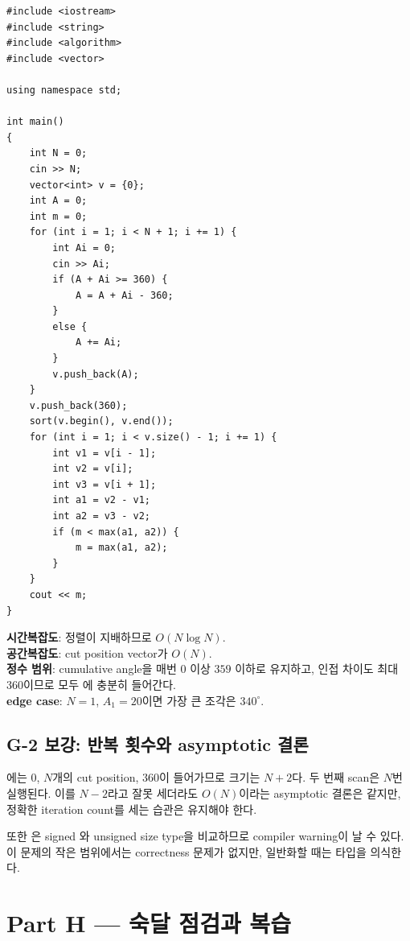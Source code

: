 \begin{answerbox}[학습자 제출 답안]
\begin{lstlisting}
#include <iostream>
#include <string>
#include <algorithm>
#include <vector>

using namespace std;

int main()
{
    int N = 0;
    cin >> N;
    vector<int> v = {0};
    int A = 0;
    int m = 0;
    for (int i = 1; i < N + 1; i += 1) {
        int Ai = 0;
        cin >> Ai;
        if (A + Ai >= 360) {
            A = A + Ai - 360;
        }
        else {
            A += Ai;
        }
        v.push_back(A);
    }
    v.push_back(360);
    sort(v.begin(), v.end());
    for (int i = 1; i < v.size() - 1; i += 1) {
        int v1 = v[i - 1];
        int v2 = v[i];
        int v3 = v[i + 1];
        int a1 = v2 - v1;
        int a2 = v3 - v2;
        if (m < max(a1, a2)) {
            m = max(a1, a2);
        }
    }
    cout << m;
}
\end{lstlisting}

\textbf{시간복잡도}: 정렬이 지배하므로 $O(N\log N)$.\\
\textbf{공간복잡도}: cut position vector가 $O(N)$.\\
\textbf{정수 범위}: cumulative angle을 매번 $0$ 이상 $359$ 이하로 유지하고, 인접 차이도 최대 $360$이므로 모두 에 충분히 들어간다.\\
\textbf{edge case}: $N=1$, $A_1=20$이면 가장 큰 조각은 $340^\circ$.
\end{answerbox}

\subsection{G-2 보강: 반복 횟수와 asymptotic 결론}
에는 $0$, $N$개의 cut position, $360$이 들어가므로 크기는 $N+2$다. 두 번째 scan은 $N$번 실행된다. 이를 $N-2$라고 잘못 세더라도 $O(N)$이라는 asymptotic 결론은 같지만, 정확한 iteration count를 세는 습관은 유지해야 한다.

또한 은 signed 와 unsigned size type을 비교하므로 compiler warning이 날 수 있다. 이 문제의 작은 범위에서는 correctness 문제가 없지만, 일반화할 때는 타입을 의식한다.

\section{Part H --- 숙달 점검과 복습}

